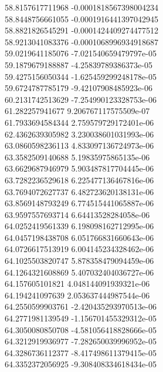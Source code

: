 {58.8157617711968 -0.0001818567398004234 \\
58.8448756661055 -0.0001916441397042945 \\
58.8821826545291 -0.0001424409274477512 \\
58.9213041083376 -0.0001068996934918687 \\
59.0219641185076 -7.021540659479797e-05 \\
59.1879679188887 -4.25839789386373e-05 \\
59.4275156050344 -1.625459299248178e-05 \\
59.6724787785179 -9.42107908485923e-06 \\
60.2131742513629 -7.254990123328753e-06 \\
61.282257941677 9.206767117575509e-07 \\
61.7933694584344 2.759579729172401e-06 \\
62.4362639305982 3.230038601031993e-06 \\
63.0860598236113 4.833097136724973e-06 \\
63.3582509140688 5.19835975865135e-06 \\
63.6629687946979 5.903487817704445e-06 \\
63.7282236529618 6.225477136467816e-06 \\
63.7694072627737 6.482723620138131e-06 \\
63.8569148793249 6.774515441065887e-06 \\
63.9597557693714 6.64413528284058e-06 \\
64.0252419561339 6.198098162712995e-06 \\
64.0457198438708 6.051766831660643e-06 \\
64.0726617513919 6.004145234328462e-06 \\
64.1025503820747 5.878358479094459e-06 \\
64.1264321608869 5.407032404036727e-06 \\
64.157605101821 4.048144091939321e-06 \\
64.194241097639 2.053637444987544e-06 \\
64.2550599903761 -2.420435293970513e-06 \\
64.2771981139549 -1.156701455329312e-05 \\
64.3050080850708 -4.581056418828666e-05 \\
64.3212919936977 -7.282650039996952e-05 \\
64.3286736112377 -8.417498611379415e-05 \\
64.3352372056925 -9.308408334618434e-05 \\
}
